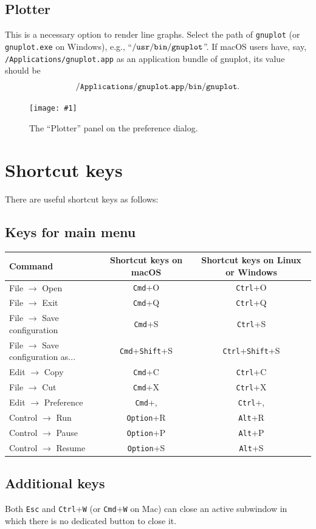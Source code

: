 \documentclass[a4paper,10pt]{report}
\newcommand\FigureOfImage[2]{\begin{figure}[h]
  \centering
  \texttt{[image: \#1]}
  \caption{#2}\label{fig:#1}
\end{figure}}
\begin{document}
\subsection{Plotter}
This is a necessary option to render line graphs.
Select the path of {\tt gnuplot} (or {\tt gnuplot.exe} on Windows), e.g.,
``$\tt{/usr/bin/gnuplot}$''. If macOS users have, say,
{\tt /Applications/gnuplot.app} as an application bundle of gnuplot,
its value should be \[{\tt /Applications/gnuplot.app/bin/gnuplot}.\]
\FigureOfImage{preference-plotter}{The ``Plotter'' panel on the preference dialog.}

\section{Shortcut keys}
There are useful shortcut keys as follows:

\subsection{Keys for main menu}
\begin{tabular}{l||c|c}
  Command & Shortcut keys on macOS & Shortcut keys on Linux or Windows\\
  \hline
  File $\rightarrow$ Open & {\tt Cmd}+O & {\tt Ctrl}+O \\
  File $\rightarrow$ Exit & {\tt Cmd}+Q & {\tt Ctrl}+Q \\
  File $\rightarrow$ Save configuration & {\tt Cmd}+S & {\tt Ctrl}+S \\
  File $\rightarrow$ Save configuration as...& {\tt Cmd}+{\tt Shift}+S & {\tt Ctrl}+{\tt Shift}+S \\
  Edit $\rightarrow$ Copy & {\tt Cmd}+C & {\tt Ctrl}+C \\
  File $\rightarrow$ Cut  & {\tt Cmd}+X & {\tt Ctrl}+X \\
  Edit $\rightarrow$ Preference & {\tt Cmd}+, & {\tt Ctrl}+, \\
  Control $\rightarrow$ Run & {\tt Option}+R & {\tt Alt}+R \\
  Control $\rightarrow$ Pause & {\tt Option}+P & {\tt Alt}+P \\
  Control $\rightarrow$ Resume & {\tt Option}+S & {\tt Alt}+S \\
\end{tabular}

\subsection{Additional keys}
Both {\tt Esc} and {\tt Ctrl}+{\tt W} (or {\tt Cmd}+{\tt W} on Mac) can close an active
subwindow in which there is no dedicated button to close it.
\end{document}
